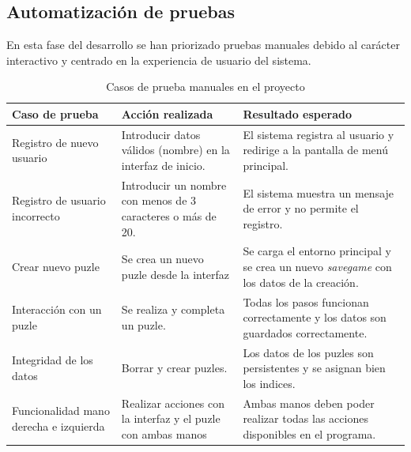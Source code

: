 \subsection{Automatización de pruebas}

En esta fase del desarrollo se han priorizado pruebas manuales debido al carácter interactivo y centrado en la experiencia de usuario del sistema.

\begin{table}[H]
    \centering
    \begin{tabular}{|p{4cm}|p{5cm}|p{5cm}|}
        \hline
        \textbf{Caso de prueba} & \textbf{Acción realizada} & \textbf{Resultado esperado} \\
        \hline
        Registro de nuevo usuario & Introducir datos válidos (nombre) en la interfaz de inicio. & El sistema registra al usuario y redirige a la pantalla de menú principal. \\
        \hline
        Registro de usuario incorrecto& Introducir un nombre con menos de 3 caracteres o más de 20. & El sistema muestra un mensaje de error y no permite el registro. \\
        \hline
        Crear nuevo puzle & Se crea un nuevo puzle desde la interfaz  & Se carga el entorno principal y se crea un nuevo \textit{savegame} con los datos de la creación. \\
        \hline
        Interacción con un puzle & Se realiza y completa un puzle. & Todas los pasos funcionan correctamente y  los datos son guardados correctamente.\\
        \hline
        Integridad de los datos & Borrar y crear puzles. & Los datos de los puzles son persistentes y se asignan bien los indices. \\
        \hline
        Funcionalidad mano derecha e izquierda & Realizar acciones con la interfaz y el puzle con ambas manos & Ambas manos deben poder realizar todas las acciones disponibles en el programa. \\
        \hline
    \end{tabular}
    \caption{Casos de prueba manuales en el proyecto}
    \label{tabla:casos-prueba-vr}
\end{table}